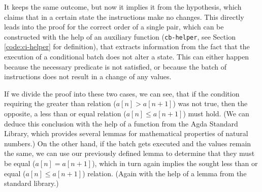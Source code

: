 It keeps the same outcome, but now it implies it from the hypothesis, which claims that in a certain state the instructions make no changes. This directly leads into the proof for the correct order of a single pair, which can be constructed with the help of an auxiliary function (\verb|cb-helper|, see Section \ref{code:ci-helper} for definition), that extracts information from the fact that the execution of a conditional batch does not alter a state. This can either happen because the necessary predicate is not satisfied, or because the batch of instructions does not result in a change of any values.

If we divide the proof into these two cases, we can see, that if the condition requiring the greater than relation ($a[n] > a[n + 1]$) was not true, then the opposite, a less than or equal relation ($a[n] \leq a[n + 1]$) must hold. (We can deduce this conclusion with the help of a function from the Agda Standard Library\cite{agda-stdlib}, which provides several lemmas for mathematical properties of natural numbers.) On the other hand, if the batch gets executed and the values remain the same, we can use our previously defined lemma to determine that they must be equal ($a[n] = a[n + 1]$), which in turn again implies the sought less than or equal ($a[n] \leq a[n + 1]$) relation. (Again with the help of a lemma from the standard library.)

